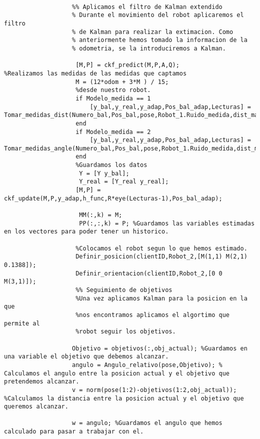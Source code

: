 \begin{lstlisting}[frame=single]
                    
                   %% Aplicamos el filtro de Kalman extendido
                   % Durante el movimiento del robot aplicaremos el filtro
                   % de Kalman para realizar la extimacion. Como
                   % anteriormente hemos tomado la informacion de la
                   % odometria, se la introduciremos a Kalman.
                    
                    [M,P] = ckf_predict(M,P,A,Q);                    %Realizamos las medidas de las medidas que captamos
                    M = (12*odom + 3*M ) / 15;
                    %desde nuestro robot.
                    if Modelo_medida == 1
                        [y_bal,y_real,y_adap,Pos_bal_adap,Lecturas] = Tomar_medidas_dist(Numero_bal,Pos_bal,pose,Robot_1.Ruido_medida,dist_max);
                    end
                    if Modelo_medida == 2
                        [y_bal,y_real,y_adap,Pos_bal_adap,Lecturas] = Tomar_medidas_angle(Numero_bal,Pos_bal,pose,Robot_1.Ruido_medida,dist_max);   
                    end
                    %Guardamos los datos
                     Y = [Y y_bal];
                     Y_real = [Y_real y_real];
                    [M,P] = ckf_update(M,P,y_adap,h_func,R*eye(Lecturas-1),Pos_bal_adap);
                     
                     MM(:,k) = M; 
                     PP(:,:,k) = P; %Guardamos las variables estimadas en los vectores para poder tener un historico.
                       
                    %Colocamos el robot segun lo que hemos estimado.
                    Definir_posicion(clientID,Robot_2,[M(1,1) M(2,1) 0.1388]);
                    Definir_orientacion(clientID,Robot_2,[0 0 M(3,1)]);
                    %% Seguimiento de objetivos
                    %Una vez aplicamos Kalman para la posicion en la que
                    %nos encontramos aplicamos el algortimo que permite al
                    %robot seguir los objetivos.
                   
                   Objetivo = objetivos(:,obj_actual); %Guardamos en una variable el objetivo que debemos alcanzar.
                   angulo = Angulo_relativo(pose,Objetivo); % Calculamos el angulo entre la posicion actual y el objetivo que pretendemos alcanzar.
                   v = norm(pose(1:2)-objetivos(1:2,obj_actual)); %Calculamos la distancia entre la posicion actual y el objetivo que queremos alcanzar.

                   w = angulo; %Guardamos el angulo que hemos calculado para pasar a trabajar con el.
                   

\end{lstlisting}
